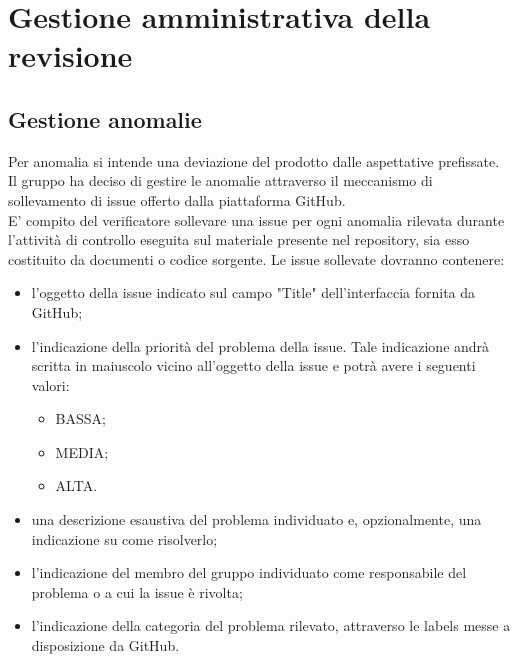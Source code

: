 
\section{Gestione amministrativa della revisione}
	\subsection{Gestione anomalie}
		Per anomalia si intende una deviazione del prodotto dalle aspettative prefissate. \\
		Il gruppo ha deciso di gestire le anomalie attraverso il meccanismo di sollevamento di issue offerto dalla piattaforma GitHub.\\
		E' compito del verificatore sollevare una issue per ogni anomalia rilevata durante l'attività di controllo eseguita sul materiale presente nel repository, sia esso costituito da documenti o codice sorgente.
		Le issue sollevate dovranno contenere:
		\begin{itemize}
			\item l'oggetto della issue indicato sul campo "Title" dell'interfaccia fornita da GitHub;
			\item l'indicazione della priorità del problema della issue. Tale indicazione andrà scritta in maiuscolo vicino all'oggetto della issue e potrà avere i seguenti valori:
				\begin{itemize}
					\item BASSA;
					\item MEDIA;
					\item ALTA.
				\end{itemize}
			\item una descrizione esaustiva del problema individuato e, opzionalmente, una indicazione su come risolverlo;
			\item l'indicazione del membro del gruppo \groupname{} individuato come responsabile del problema o a cui la issue è rivolta;
			\item l'indicazione della categoria del problema rilevato, attraverso le labels messe a disposizione da GitHub.
		\end{itemize}